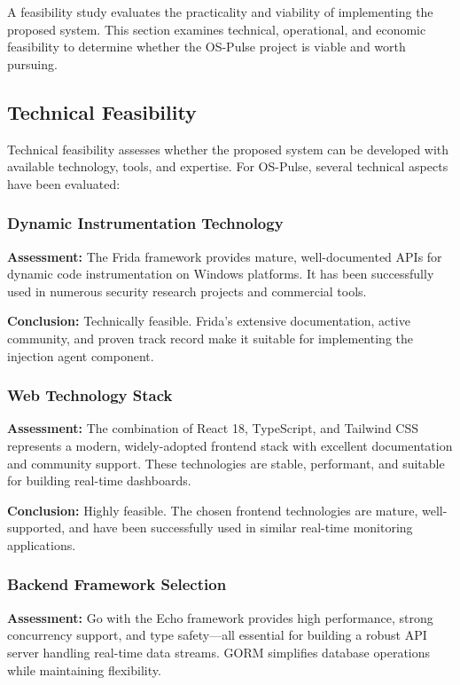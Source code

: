 A feasibility study evaluates the practicality and viability of implementing the proposed system. This section examines technical, operational, and economic feasibility to determine whether the OS-Pulse project is viable and worth pursuing.

\subsection{Technical Feasibility}

Technical feasibility assesses whether the proposed system can be developed with available technology, tools, and expertise. For OS-Pulse, several technical aspects have been evaluated:

\subsubsection{Dynamic Instrumentation Technology}

\textbf{Assessment:} The Frida framework provides mature, well-documented APIs for dynamic code instrumentation on Windows platforms. It has been successfully used in numerous security research projects and commercial tools.

\textbf{Conclusion:} Technically feasible. Frida's extensive documentation, active community, and proven track record make it suitable for implementing the injection agent component.

\subsubsection{Web Technology Stack}

\textbf{Assessment:} The combination of React 18, TypeScript, and Tailwind CSS represents a modern, widely-adopted frontend stack with excellent documentation and community support. These technologies are stable, performant, and suitable for building real-time dashboards.

\textbf{Conclusion:} Highly feasible. The chosen frontend technologies are mature, well-supported, and have been successfully used in similar real-time monitoring applications.

\subsubsection{Backend Framework Selection}

\textbf{Assessment:} Go with the Echo framework provides high performance, strong concurrency support, and type safety—all essential for building a robust API server handling real-time data streams. GORM simplifies database operations while maintaining flexibility.

